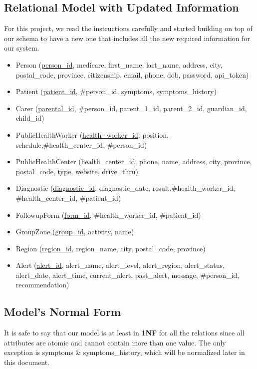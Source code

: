 \documentclass{article}
\begin{document}
\subsection{Relational Model with Updated Information}
For this project, we read the instructions carefully and started building on top of our schema to have a new one that includes all the new required information for our system.
\begin{itemize}
    \item Person (\underline{person\_id}, medicare, first\_name, last\_name, address, city, postal\_code, province, citizenship, email, phone, dob, password, api\_token)
    \item Patient (\underline{patient\_id}, \#person\_id, symptoms, symptoms\_history)
    \item Carer (\underline{parental\_id}, \#person\_id, parent\_1\_id, parent\_2\_id, guardian\_id, child\_id)
    \item PublicHealthWorker (\underline{health\_worker\_id}, position, schedule,\#health\_center\_id, \#person\_id)
    \item PublicHealthCenter (\underline{health\_center\_id}, phone, name, address, city, province, postal\_code, type, website, drive\_thru)
    \item Diagnostic (\underline{diagnostic\_id}, diagnostic\_date, result,\#health\_worker\_id, \#health\_center\_id, \#patient\_id)
    \item FollowupForm (\underline{form\_id}, \#health\_worker\_id, \#patient\_id)
    \item GroupZone (\underline{group\_id}, activity, name)
    \item Region (\underline{region\_id}, region\_name, city, postal\_code, province)
    \item Alert (\underline{alert\_id}, alert\_name, alert\_level, alert\_region, alert\_status, alert\_date, alert\_time, current\_alert, past\_alert, message, \#person\_id, recommendation)
    \end{itemize}

\subsection{Model's Normal Form}
It is safe to say that our model is at least in \textbf{1NF} for all the relations since all attributes are atomic and cannot contain more than one value. The only exception is symptoms \& symptoms\_history, which will be normalized later in this document.
\end{document}
